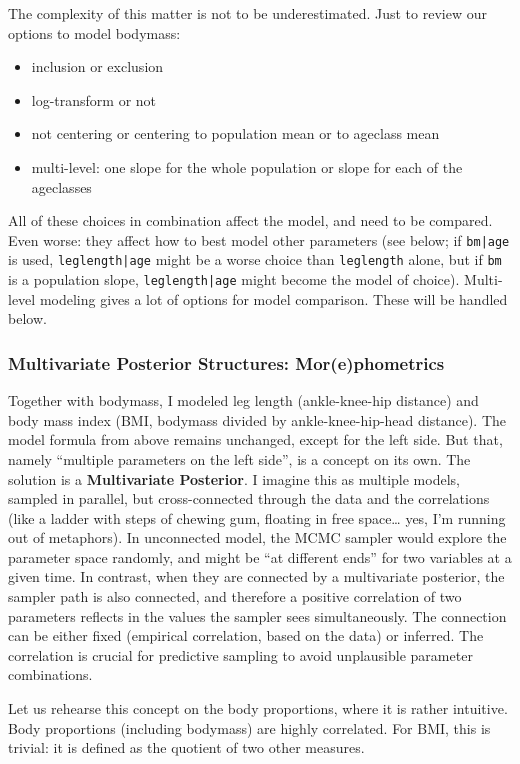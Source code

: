 The complexity of this matter is not to be underestimated.
Just to review our options to model bodymass:
\begin{itemize}
\item inclusion or exclusion
\item log-transform or not
\item not centering or centering to population mean or to ageclass mean
\item multi-level: one slope for the whole population or slope for each of the ageclasses
\end{itemize}

All of these choices in combination affect the model, and need to be compared.
Even worse: they affect how to best model other parameters (see below; if \texttt{bm|age} is used, \texttt{leglength|age} might be a worse choice than \texttt{leglength} alone, but if \texttt{bm} is a population slope, \texttt{leglength|age} might become the model of choice).
Multi-level modeling gives a lot of options for model comparison.
These will be handled below.


\subsubsection{Multivariate Posterior Structures: Mor(e)phometrics}
\label{sec:orgf2c37c2}
Together with bodymass, I modeled leg length (ankle-knee-hip distance) and body mass index (BMI, bodymass divided by ankle-knee-hip-head distance).
The model formula from above remains unchanged, except for the left side.
But that, namely ``multiple parameters on the left side'', is a concept on its own.
The solution is a \textbf{Multivariate Posterior}.
I imagine this as multiple models, sampled in parallel, but cross-connected through the data and the correlations (like a ladder with steps of chewing gum, floating in free space\ldots{} yes, I'm running out of metaphors).
In unconnected model, the MCMC sampler would explore the parameter space randomly, and might be ``at different ends'' for two variables at a given time.
In contrast, when they are connected by a multivariate posterior, the sampler path is also connected, and therefore a positive correlation of two parameters reflects in the values the sampler sees simultaneously.
The connection can be either fixed (empirical correlation, based on the data) or inferred.
The correlation is crucial for predictive sampling to avoid unplausible parameter combinations.


Let us rehearse this concept on the body proportions, where it is rather intuitive.
Body proportions (including bodymass) are highly correlated.
For BMI, this is trivial: it is defined as the quotient of two other measures.

